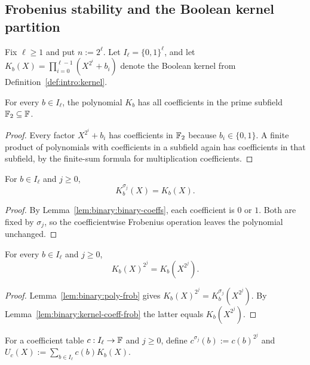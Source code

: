 \subsection{Frobenius stability and the Boolean kernel partition}\label{sec:binary:kernel}

Fix $\ell\geq1$ and put $n:=2^\ell$. Let $I_\ell=\{0,1\}^\ell$, and let
$K_b(X)=\prod_{i=0}^{\ell-1}(X^{2^i}+b_i)$ denote the Boolean kernel from Definition~\ref{def:intro:kernel}.

\begin{lemma}\label{lem:binary:binary-coeffs}
For every $b\in I_\ell$, the polynomial $K_b$ has all coefficients in
the prime subfield $\mathbb{F}_2\subseteq\mathbb{F}$.
\end{lemma}
\begin{proof}
Every factor $X^{2^i}+b_i$ has coefficients in $\mathbb{F}_2$ because
$b_i\in\{0,1\}$. A finite product of polynomials with coefficients
in a subfield again has coefficients in that subfield, by the
finite-sum formula for multiplication coefficients.
\end{proof}

\begin{lemma}\label{lem:binary:kernel-coeff-frob}
For $b\in I_\ell$ and $j\geq0$,
\[
 K_b^{\sigma_j}(X)=K_b(X).
\]
\end{lemma}
\begin{proof}
By Lemma~\ref{lem:binary:binary-coeffs}, each coefficient is
$0$ or $1$. Both are fixed by $\sigma_j$, so the coefficientwise
Frobenius operation leaves the polynomial unchanged.
\end{proof}

\begin{theorem}\label{thm:binary:kernel-square}
For every $b\in I_\ell$ and $j\geq0$,
\[
 \boxed{K_b(X)^{2^j}=K_b(X^{2^j}).}
\]
\end{theorem}
\begin{proof}
Lemma~\ref{lem:binary:poly-frob} gives
$K_b(X)^{2^j}=K_b^{\sigma_j}(X^{2^j})$.
By Lemma~\ref{lem:binary:kernel-coeff-frob} the latter equals
$K_b(X^{2^j})$.
\end{proof}

\begin{definition}\label{def:binary:table-frob}
For a coefficient table $c:I_\ell\to\mathbb{F}$ and $j\geq0$, define
$c^{\sigma_j}(b):=c(b)^{2^j}$ and
$U_c(X):=\sum_{b\in I_\ell}c(b)K_b(X)$.
\end{definition}

